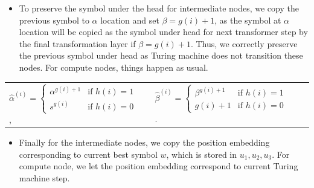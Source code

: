 \begin{itemize}[leftmargin=6mm, itemsep=2mm, partopsep=0mm,parsep=0mm]
    \item To preserve the symbol under the head for intermediate nodes, we copy the previous symbol to $\alpha$ location and set $\beta=g(i)+1$, as the symbol at $\alpha$ location will be copied as the symbol under head for next transformer step by the final transformation layer if $\beta=g(i)+1$. Thus, we correctly preserve the previous symbol under head as Turing machine does not transition these nodes. For compute nodes, things happen as usual.
\end{itemize}
\begin{table}[h]
    \small
    \vspace{-3mm}
    \hspace*{12mm}
    \begin{tabular}{lclcl}
    $
    \hat{\alpha}^{(i)} = 
    \begin{cases} 
    \alpha^{g(i)+1} & \text{if }h(i)=1 \\
    s^{g(i)} & \text{if }h(i)=0
    \end{cases} 
    $ ,
    &&
    $
    \hat{\beta}^{(i)} = 
    \begin{cases} 
    \beta^{g(i)+1} & \text{if }h(i)=1 \\
    g(i)+1 & \text{if }h(i)=0
    \end{cases} 
    $ .
    \end{tabular}
    \vspace{-3mm}
\end{table}
\begin{itemize}[leftmargin=6mm, itemsep=3mm, partopsep=0mm,parsep=0mm]
    \item Finally for the intermediate nodes, we copy the position embedding corresponding to current best symbol $w$, which is stored in $u_1,u_2,u_3$. For compute node, we let the position embedding correspond to current Turing machine step.
\end{itemize}
\vspace{-3mm}
